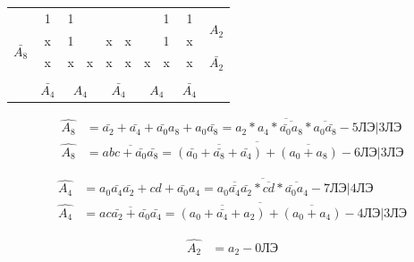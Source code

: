 \documentclass[a4paper,14pt]{article}
\begin{document}
\begin{table}[H]
\begin{minipage}{.5\linewidth}
\begin{tabular}{cccccccccc}
			\multicolumn{1}{c|}{} & \multicolumn{1}{c|}{1} & \multicolumn{1}{c|}{1} & \multicolumn{1}{c|}{} & \multicolumn{1}{c|}{} & \multicolumn{1}{c|}{} & \multicolumn{1}{c|}{} & \multicolumn{1}{c|}{1} & \multicolumn{1}{c|}{1} & \multirow{2}{*}{$A_2$} \\ \cline{2-9}
			\multicolumn{1}{c|}{\multirow{2}{*}{$\bar{A_8}$}} & \multicolumn{1}{c|}{x} & \multicolumn{1}{c|}{1} & \multicolumn{1}{c|}{} & \multicolumn{1}{c|}{x} & \multicolumn{1}{c|}{x} & \multicolumn{1}{c|}{} & \multicolumn{1}{c|}{1} & \multicolumn{1}{c|}{x} &  \\ \cline{2-9}
			\multicolumn{1}{c|}{} & \multicolumn{1}{c|}{x} & \multicolumn{1}{c|}{x} & \multicolumn{1}{c|}{x} & \multicolumn{1}{c|}{x} & \multicolumn{1}{c|}{x} & \multicolumn{1}{c|}{x} & \multicolumn{1}{c|}{x} & \multicolumn{1}{c|}{x} & $\bar{A_2}$ \\ \cline{2-9}
			\\
			& $\bar{A_4}$ & \multicolumn{2}{c}{$A_4$} & \multicolumn{2}{c}{$\bar{A_4}$} & \multicolumn{2}{c}{$A_4$} & $\bar{A_4}$ & 
		\end{tabular}
	\end{minipage} 
\end{table}

\begin{equation*}
\begin{aligned}
\widehat{A_8} &= \bar{a_2} + \bar{a_4} + \bar{a_0}a_8 + a_0\bar{a_8} = \overline{a_2*a_4*\overline{\bar{a_0}a_8}*\overline{a_0\bar{a_8}}} - \text{5ЛЭ|3ЛЭ} \\
\widehat{A_8} &= \overline{abc+\bar{a_0}\bar{a_8}} = \overline{\overline{(\bar{a_0}+\bar{a_8}+\bar{a_4})}+\overline{(a_0+a_8)}} - \text{6ЛЭ|3ЛЭ}
\end{aligned}
\end{equation*}

\begin{equation*}
\begin{aligned}
\widehat{A_4} &= a_0\bar{a_4}\bar{a_2} + cd + \bar{a_0}a_4 = \overline{\overline{a_0\bar{a_4}\bar{a_2}}*\overline{cd}*\overline{\bar{a_0}a_4}} - \text{7ЛЭ|4ЛЭ} \\
\widehat{A_4} &= \overline{ac\bar{a_2} + \bar{a_0}\bar{a_4}}  = 
\overline{\overline{(a_0+\bar{a_4}+a_2)}+\overline{(a_0+a_4)}}- \text{4ЛЭ|3ЛЭ}
\end{aligned}
\end{equation*}

\begin{equation*}
\begin{aligned}
\widehat{A_2} &= a_2 - \text{0ЛЭ}
\end{aligned}
\end{equation*}
\end{document}
